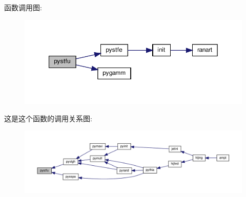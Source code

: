 函数调用图\+:
\nopagebreak
\begin{figure}[H]
\begin{center}
\leavevmode
\includegraphics[width=350pt]{pystfu_8f90_ab0e0df59c24e16aa2077468a12ecb07e_cgraph}
\end{center}
\end{figure}
这是这个函数的调用关系图\+:
\nopagebreak
\begin{figure}[H]
\begin{center}
\leavevmode
\includegraphics[width=350pt]{pystfu_8f90_ab0e0df59c24e16aa2077468a12ecb07e_icgraph}
\end{center}
\end{figure}
